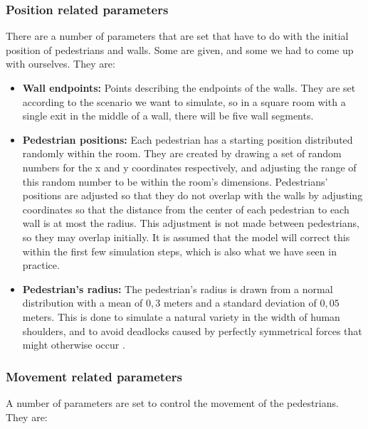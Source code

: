 \subsubsection{Position related parameters}
There are a number of parameters that are set that have to do with the initial 
position of pedestrians and walls. Some are given, and some we had to come up
with ourselves. They are:

\begin{itemize}
    \item \textbf{Wall endpoints:} Points describing the endpoints of the 
        walls. They are set according to the scenario we want to simulate, so 
        in a square room with a single exit in the middle of a wall, there 
        will be five wall segments.

    \item \textbf{Pedestrian positions:} Each pedestrian has a starting position 
        distributed randomly within the room. They are created by drawing a 
        set of random numbers for the x and y coordinates respectively, and 
        adjusting the range of this random number to be within the room's 
        dimensions. Pedestrians' positions are adjusted so that they do not overlap 
        with the walls by adjusting coordinates so that the distance from the 
        center of each pedestrian to each wall is at most the radius. This 
        adjustment is not made between pedestrians, so they may overlap initially. 
        It is assumed that the model will correct this within the first few 
        simulation steps, which is also what we have seen in practice.

    \item \textbf{Pedestrian's radius:} The pedestrian's radius is drawn from a normal 
        distribution with a mean of $0,3$ meters and a standard deviation of 
        $0,05$ meters. This is done to simulate a natural variety in the width 
        of human shoulders, and to avoid deadlocks caused by perfectly 
        symmetrical forces that might otherwise occur \cite{helbing00}.
\end{itemize}

\subsubsection{Movement related parameters}
A number of parameters are set to control the movement of the pedestrians. They 
are:

